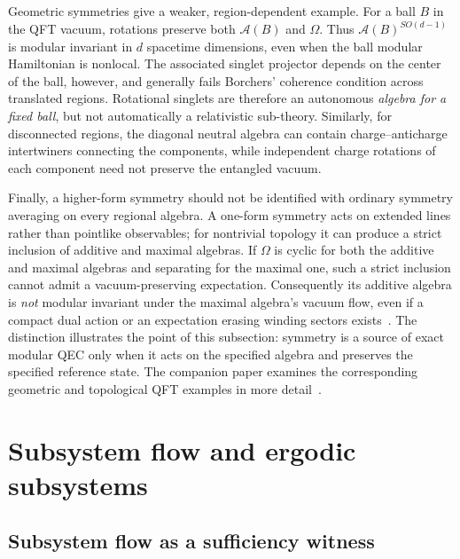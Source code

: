 \documentclass[a4paper,11pt]{article}
\theoremstyle{definition}
\begin{document}
Geometric symmetries give a weaker, region-dependent example. For a
ball $B$ in the QFT vacuum, rotations preserve both $\mathcal A(B)$ and
$\Omega$. Thus $\mathcal A(B)^{SO(d-1)}$ is modular invariant in
$d$ spacetime dimensions, even when the ball modular Hamiltonian is
nonlocal. The associated singlet projector depends on the center of the
ball, however, and generally fails Borchers' coherence condition across
translated regions. Rotational singlets are therefore an autonomous
\emph{algebra for a fixed ball}, but not automatically a relativistic
sub-theory. Similarly, for disconnected regions, the diagonal neutral
algebra can contain charge--anticharge intertwiners connecting the
components, while independent charge rotations of each component need
not preserve the entangled vacuum.

Finally, a higher-form symmetry should not be identified with ordinary
symmetry averaging on every regional algebra. A one-form symmetry acts
on extended lines rather than pointlike observables; for nontrivial
topology it can produce a strict inclusion of additive and maximal
algebras. If $\Omega$ is cyclic for both the additive and maximal algebras and separating
for the maximal one, such a strict inclusion cannot admit a
vacuum-preserving expectation. Consequently its additive algebra is
\emph{not} modular invariant under the maximal algebra's vacuum flow,
even if a compact dual action or an expectation erasing winding sectors
exists~\cite{GaiottoKapustinSeibergWillett2015,CasiniHuertaMaganPontello2021}.
The distinction illustrates the point of this subsection: symmetry is a
source of exact modular QEC only when it acts on the specified algebra
and preserves the specified reference state. The companion paper
examines the corresponding geometric and topological QFT examples in
more detail~\cite{companionQFT}.


\section{Subsystem flow and ergodic subsystems}\label{sec:ergodic}








\subsection{Subsystem flow as a sufficiency witness}\label{subsec:QEC-sufficiency}
\end{document}
